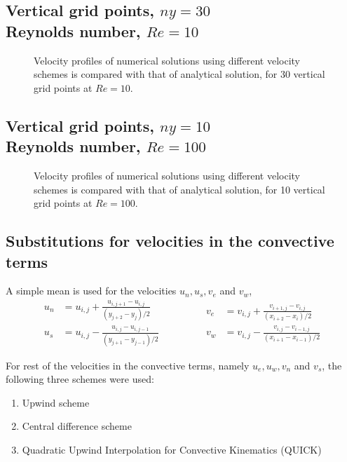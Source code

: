 \documentclass[12pt,a4paper,fleqn]{article}
\begin{document}
\subsection{Vertical grid points, \(ny=30\)\\
    Reynolds number, \(Re=10\)}

\begin{figure}[H]
    \centering
    \caption{Velocity profiles of numerical solutions using different velocity schemes is compared with that of analytical solution, for 30 vertical grid points at \(Re = 10\).}
    \label{fig:ny-30_profilesComparison}
\end{figure}

\subsection{Vertical grid points, \(ny=10\)\\
    Reynolds number, \(Re=100\)}

\begin{figure}[H]
    \centering
    \caption{Velocity profiles of numerical solutions using different velocity schemes is compared with that of analytical solution, for 10 vertical grid points at \(Re = 100\).}
    \label{fig:Re-100_ny-10_profilesComparison}
\end{figure}

\subsection{Substitutions for velocities in the convective terms}
A simple mean is used for the velocities $u_n, u_s, v_e$ and $v_w$,
\begin{equation*}
\begin{aligned}
u_n &= u_{i,j} + \frac{u_{i,j+1} - u_{i,j}}{(y_{j+2}-y_j)/2}\\
u_s &= u_{i,j} - \frac{u_{i,j} - u_{i,j-1}}{(y_{j+1}-y_{j-1})/2}
\end{aligned}
\qquad\qquad
\begin{aligned}
v_e &= v_{i,j} + \frac{v_{i+1,j} - v_{i,j}}{(x_{i+2}-x_i)/2}\\
v_w &= v_{i,j} - \frac{v_{i,j} - v_{i-1,j}}{(x_{i+1}-x_{i-1})/2}
\end{aligned}
\end{equation*}

For rest of the velocities in the convective terms, namely $u_e, u_w, v_n$ and $v_s$, the following three schemes were used:
\begin{enumerate}
\setlength\itemsep{0em}
\item Upwind scheme
\item Central difference scheme
\item Quadratic Upwind Interpolation for Convective Kinematics (QUICK)
\end{enumerate}
\end{document}
